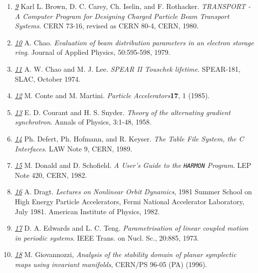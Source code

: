 \begin{enumerate}
	\item \href{transport}{\textit{9}} Karl L. Brown, D. C. Carey,
          Ch. Iselin, and F. Rothacker. \textit{TRANSPORT - A Computer
            Program for Designing Charged   Particle Beam Transport
            Systems}. CERN 73-16, revised as CERN 80-4, CERN, 1980. 

	\item \href{chao}{\textit{10}} A. Chao. \textit{Evaluation of
          beam distribution parameters in an electron   storage
          ring}. Journal of Applied Physics, 50:595-598, 1979. 

	\item \href{chao1}{\textit{11}} A. W. Chao and
          M. J. Lee. \textit{SPEAR II Touschek lifetime}. SPEAR-181,
          SLAC, October 1974. 

	\item \href{conte}{\textit{12}} M. Conte and
          M. Martini. \textit{Particle Accelerators}\textbf{17}, 1
          (1985). 

	\item \href{courant}{\textit{13}} E. D. Courant and
          H. S. Snyder. \textit{Theory of the alternating gradient
            synchrotron}. Annals of Physics, 3:1-48, 1958. 

	\item \href{tfs}{\textit{14}} Ph. Defert, Ph. Hofmann, and
          R. Keyser. \textit{The Table File System, the C
            Interfaces}. LAW Note 9, CERN, 1989. 

	\item \href{donald}{\textit{15}} M. Donald and
          D. Schofield. \textit{A User's Guide to the \texttt{HARMON}
            Program}. LEP Note 420, CERN, 1982. 

	\item \href{dragt}{\textit{16}} A. Dragt. \textit{Lectures on
          Nonlinear Orbit Dynamics}, 1981 Summer School on High   Energy
          Particle Accelerators, Fermi National Accelerator Laboratory,
          July   1981. American Institute of Physics, 1982. 

	\item \href{edwards}{\textit{17}} D. A. Edwards and
          L. C. Teng. \textit{Parametrisation of linear coupled motion
            in periodic systems}. IEEE Trans. on Nucl. Sc., 20:885,
          1973. 

	\item \href{giovanozzi}{\textit{18}} M. Giovannozzi,
          \textit{Analysis of the stability domain of planar symplectic
            maps using invariant manifolds}, CERN/PS 96-05 (PA) (1996). 


\end{enumerate}
